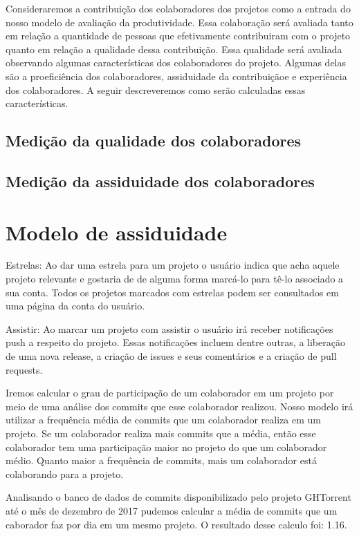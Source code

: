 Consideraremos a contribuição dos colaboradores dos projetos como a entrada do nosso modelo de avaliação da produtividade. Essa colaboração será avaliada tanto em relação a quantidade de pessoas que efetivamente contribuiram com o projeto quanto em relação a qualidade dessa contribuição. Essa qualidade será avaliada observando algumas características dos colaboradores do projeto. Algumas delas são a proeficiência dos colaboradores, assiduidade da contribuiçãoe e experiência dos colaboradores. A seguir descreveremos como serão calculadas essas características.

\subsection{Medição da qualidade dos colaboradores}


\subsection{Medição da assiduidade dos colaboradores}




\section{Modelo de assiduidade}

Estrelas: Ao dar uma estrela para um projeto o usuário indica que acha aquele projeto relevante e gostaria de de alguma forma marcá-lo para tê-lo associado a sua conta. Todos os projetos marcados com estrelas podem ser consultados em uma página da conta do usuário.

Assistir: Ao marcar um projeto com assistir o usuário irá receber notificações push a respeito do projeto. Essas notificações incluem dentre outras, a liberação de uma nova release, a criação de issues e seus comentários e a criação de pull requests.

Iremos calcular o grau de participação de um colaborador em um projeto por meio de uma análise dos commits que esse colaborador realizou. Nosso modelo irá utilizar a frequência média de commits que um colaborador realiza em um projeto. Se um colaborador realiza mais commits que a média, então esse colaborador tem uma participação maior no projeto do que um colaborador médio. Quanto maior a frequência de commits, mais um colaborador está colaborando para a projeto.

Analisando o banco de dados de commits disponibilizado pelo projeto GHTorrent até o mês de dezembro de 2017 pudemos calcular a média de commits que um caborador faz por dia em um mesmo projeto. O resultado desse calculo foi: 1.16.

